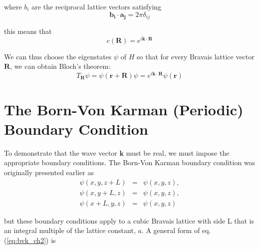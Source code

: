 where $b_i$ are the reciprocal lattice vectors satisfying
\begin{equation} \label{eq:recip_b}
\boldsymbol{b_i \cdot a_j}
= 2 \pi \delta_{ij}
\end{equation}

this means that
\begin{equation} \label{eq:c(R)}
c(\boldsymbol{R}) 
= e^{i \boldsymbol{k} \cdot \boldsymbol{R}}
\end{equation}

We can thus choose the eigenstates $\psi$ of $H$ so that for every Bravais lattice vector $\boldsymbol{R}$, we can obtain Bloch's theorem:
\begin{equation} \label{eq:bloch_proof_qm}
T_\boldsymbol{R} \psi
= \psi(\boldsymbol{r} + \boldsymbol{R}) \psi
= e^{i \boldsymbol{k} \cdot \boldsymbol{R}}
\psi(\boldsymbol{r})
\end{equation}

\section{The Born-Von Karman (Periodic) Boundary Condition}
To demonstrate that the wave vector $\boldsymbol{k}$ must be real, we must impose the appropriate boundary conditions. The Born-Von Karman boundary condition was originally presented earlier as
\begin{eqnarray} \label{eq:bvk_ch2}
\psi(x,y,z+L) &=& \psi(x,y,z), \\
\psi(x,y+L,z) &=& \psi(x,y,z), \\
\psi(x+L,y,z) &=& \psi(x,y,z)
\end{eqnarray}


but these boundary conditions apply to a cubic Bravais lattice with side L that is an integral multiple of the lattice constant, $a$. A general form of eq. (\ref{eq:bvk_ch2}) is

















